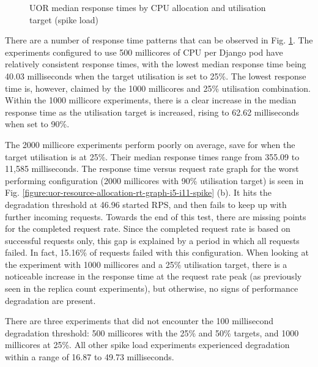\begin{figure}[H]
    \caption{UOR median response times by CPU allocation and utilisation target (spike load)}
    \label{figure:uor-resource-allocation-rt-comp-spike}
\end{figure}

There are a number of response time patterns that can be observed in Fig. \ref{figure:uor-resource-allocation-rt-comp-spike}. The experiments configured to use 500 millicores of CPU per Django pod have relatively consistent response times, with the lowest median response time being 40.03 milliseconds when the target utilisation is set to 25\%. The lowest response time is, however, claimed by the 1000 millicores and 25\% utilisation combination. Within the 1000 millicore experiments, there is a clear increase in the median response time as the utilisation target is increased, rising to 62.62 milliseconds when set to 90\%.

The 2000 millicore experiments perform poorly on average, save for when the target utilisation is at 25\%. Their median response times range from 355.09 to 11,585 milliseconds. The response time versus request rate graph for the worst performing configuration (2000 millicores with 90\% utilisation target) is seen in Fig. \ref{figure:uor-resource-allocation-rt-graph-i5-i11-spike} (b). It hits the degradation threshold at 46.96 started RPS, and then fails to keep up with further incoming requests. Towards the end of this test, there are missing points for the completed request rate. Since the completed request rate is based on successful requests only, this gap is explained by a period in which all requests failed. In fact, 15.16\% of requests failed with this configuration. When looking at the experiment with 1000 millicores and a 25\% utilisation target, there is a noticeable increase in the response time at the request rate peak (as previously seen in the replica count experiments), but otherwise, no signs of performance degradation are present.

There are three experiments that did not encounter the 100 millisecond degradation threshold: 500 millicores with the 25\% and 50\% targets, and 1000 millicores at 25\%. All other spike load experiments experienced degradation within a range of 16.87 to 49.73 milliseconds.

